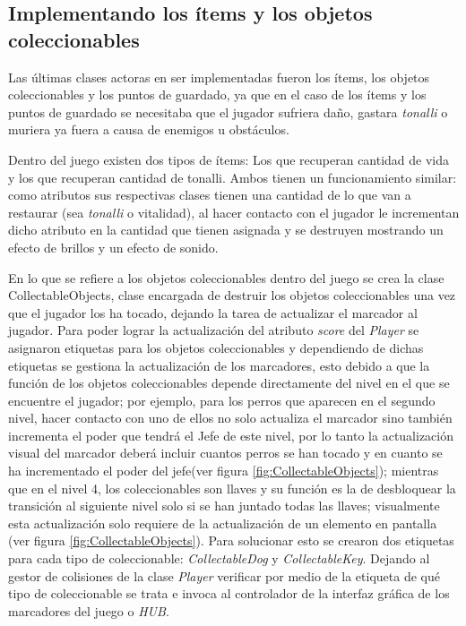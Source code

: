 \subsection{Implementando los ítems y los objetos coleccionables}
Las últimas clases actoras en ser implementadas fueron los ítems, los objetos
coleccionables y los puntos de guardado, ya que en el caso de los ítems y los
puntos de guardado se necesitaba que el jugador sufriera daño, gastara
\textit{tonalli} o muriera ya fuera a causa de enemigos u obstáculos.
\\
\par
Dentro del juego existen dos tipos de ítems: Los que recuperan cantidad de vida y
los que recuperan cantidad de tonalli. Ambos tienen un funcionamiento similar: como
atributos sus respectivas clases tienen una cantidad de lo que van a restaurar
(sea \textit{tonalli} o vitalidad), al hacer contacto con el jugador le incrementan
dicho atributo en la cantidad que tienen asignada y se destruyen mostrando un
efecto de brillos y un efecto de sonido.
\\
\par
En lo que se refiere a los objetos coleccionables dentro del juego se crea la
clase CollectableObjects, clase encargada de destruir los objetos coleccionables
una vez que el jugador los ha tocado, dejando la tarea de actualizar el marcador
al jugador. Para poder lograr la actualización del atributo \textit{score} del
\textit{Player} se asignaron etiquetas para los objetos coleccionables y dependiendo
de dichas etiquetas se gestiona la actualización de los marcadores, esto debido a que
la función de los objetos coleccionables depende directamente del nivel en el que
se encuentre el jugador; por ejemplo, para los perros que aparecen en el segundo
nivel, hacer contacto con uno de ellos no solo actualiza el marcador sino también
incrementa el poder que tendrá el Jefe de este nivel, por lo tanto
la actualización visual del marcador deberá incluir cuantos perros se han tocado
y en cuanto se ha incrementado el poder del jefe(ver figura
\ref{fig:CollectableObjects}); mientras que en el nivel 4, los coleccionables
son llaves y su función es la de desbloquear la transición al siguiente nivel
solo si se han juntado todas las llaves; visualmente esta actualización solo
requiere de la actualización de un elemento en pantalla (ver figura 
\ref{fig:CollectableObjects}). Para solucionar esto se crearon dos etiquetas 
para cada tipo de coleccionable: \textit{CollectableDog} y 
\textit{CollectableKey}.  Dejando al gestor de colisiones de la clase 
\textit{Player} verificar por medio de la etiqueta de qué tipo de coleccionable 
se trata e invoca al controlador de la interfaz gráfica de los marcadores del 
juego o \textit{HUB}.
            
